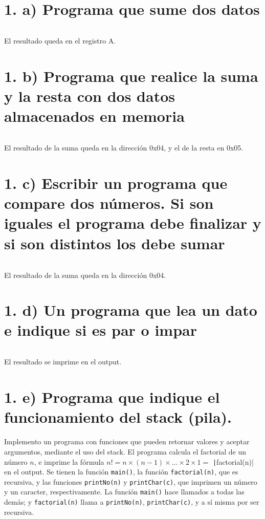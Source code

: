 \documentclass{article}
\begin{document}


\section*{1. a) Programa que sume dos datos}

\inputminted{nasm}{./code/1a.txt}

El resultado queda en el registro A.

\section*{1. b) Programa que realice la suma y la resta con dos datos almacenados en memoria}

\inputminted{nasm}{./code/1b.txt}

El resultado de la suma queda en la dirección 0x04, y el de la resta en 0x05.

\section*{1. c) Escribir un programa que compare dos números. Si son iguales el programa debe finalizar y si son distintos los debe sumar}

\inputminted{nasm}{./code/1c.txt}

El resultado de la suma queda en la dirección 0x04.

\section*{1. d) Un programa que lea un dato e indique si es par o impar}

\inputminted{nasm}{./code/1d.txt}

El resultado se imprime en el output.

\section*{1. e) Programa que indique el funcionamiento del stack (pila).}

Implemento un programa con funciones que pueden retornar valores y aceptar argumentos, mediante el uso del stack. El programa calcula el factorial de un número $n$, e imprime la fórmula $n! = n \times (n-1) \times \dots \times 2 \times 1 =$ \texttt|factorial(n)| en el output. Se tienen la función \texttt{main()}, la función \texttt{factorial(n)}, que es recursiva, y las funciones \texttt{printNo(n)} y \texttt{printChar(c)}, que imprimen un número y un caracter, respectivamente. La función \texttt{main()} hace llamados a todas las demás; y \texttt{factorial(n)} llama a \texttt{printNo(n)}, \texttt{printChar(c)}, y a sí misma por ser recursiva. 
\end{document}
